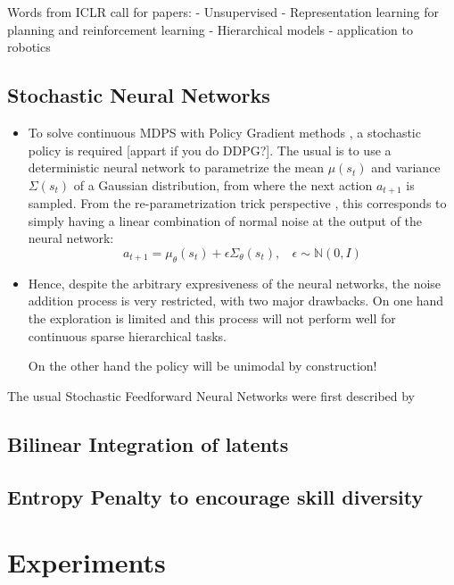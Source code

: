 \documentclass{article} %
\begin{document}
Words from ICLR call for papers:
- Unsupervised
- Representation learning for planning and reinforcement learning
- Hierarchical models
- application to robotics

\subsection{Stochastic Neural Networks}

\begin{itemize}
    \item To solve continuous MDPS with Policy Gradient methods \citep{peters2008reinforcement}, a stochastic policy is required [appart if you do DDPG?]. The usual is to use a deterministic neural network to parametrize the mean $\mu(s_t)$ and variance $\Sigma(s_t)$ of a Gaussian distribution, from where the next action $a_{t+1}$ is sampled. From the re-parametrization trick perspective \citep{look at SVG paper or DeepMind-modulate}, this corresponds to simply having a linear combination of normal noise at the output of the neural network:
    \begin{equation}
        a_{t+1} = \mu_{\theta}(s_t) +\epsilon \Sigma_\theta(s_t), ~~~~ \epsilon \sim \mathbb{N}(0,I)
    \end{equation}
    \item Hence, despite the arbitrary expresiveness of the neural networks, the noise addition process is very restricted, with two major drawbacks. On one hand the exploration is limited and this process will not perform well for continuous sparse hierarchical tasks. 
    
    On the other hand the policy will be unimodal by construction!
\end{itemize}
The usual Stochastic Feedforward Neural Networks were first described by \citet{tang2013sfnn}

\subsection{Bilinear Integration of latents}

\subsection{Entropy Penalty to encourage skill diversity}

\section{Experiments}
\end{document}
